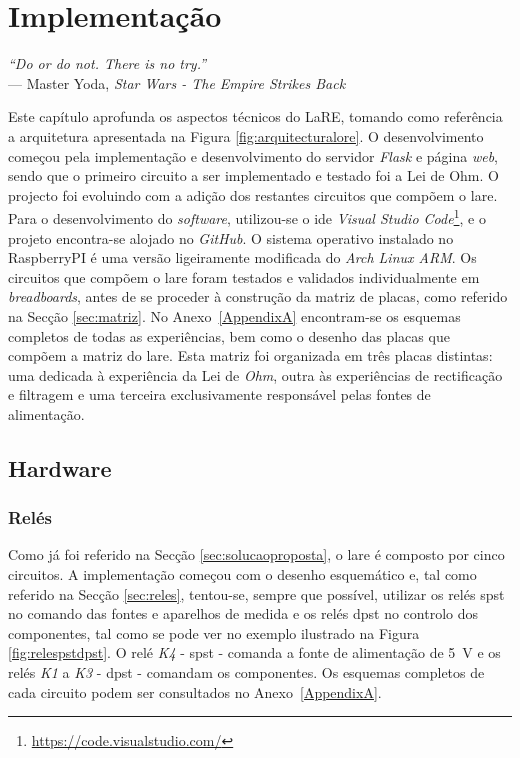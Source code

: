 \chapter{Implementação}
\label{Capítulo4}

\begin{flushright}
\textit{``Do or do not. There is no try.''} \\[0.5em]
--- Master Yoda, \textit{Star Wars - The Empire Strikes Back}
\end{flushright}


Este capítulo aprofunda os aspectos técnicos do LaRE, tomando como referência a arquitetura apresentada na Figura \ref{fig:arquitecturalore}. O desenvolvimento começou pela implementação e desenvolvimento do servidor \textit{Flask} e página \textit{web}, sendo que o primeiro circuito a ser implementado e testado foi a Lei de Ohm. O projecto foi evoluindo com a adição dos restantes circuitos que compõem o \acrshort{lare}. Para o desenvolvimento do \textit{software}, utilizou-se o \acrshort{ide} \textit{Visual Studio Code}\footnote{\url{https://code.visualstudio.com/}}, e o projeto encontra-se alojado no \textit{GitHub}. O sistema operativo instalado no \gls{RaspberryPI} é uma versão ligeiramente modificada do \textit{Arch Linux ARM}. Os circuitos que compõem o \acrshort{lare} foram testados e validados individualmente em \textit{breadboards}, antes de se proceder à construção da matriz de placas, como referido na Secção \ref{sec:matriz}. No Anexo~\ref{AppendixA} encontram-se os esquemas completos de todas as experiências, bem como o desenho das placas que compõem a matriz do \acrshort{lare}. Esta matriz foi organizada em três placas distintas: uma dedicada à experiência da Lei de \textit{Ohm}, outra às experiências de rectificação e filtragem e uma terceira exclusivamente responsável pelas fontes de alimentação.

\section{Hardware}
\subsection{Relés}
\label{sec:hwreles}
Como já foi referido na Secção \ref{sec:solucaoproposta}, o \acrshort{lare} é composto por cinco circuitos. A implementação começou com o desenho esquemático e, tal como referido na Secção \ref{sec:reles}, tentou-se, sempre que possível, utilizar os relés \acrshort{spst} no comando das fontes e aparelhos de medida e os relés \acrshort{dpst} no controlo dos componentes, tal como se pode ver no exemplo ilustrado na Figura \ref{fig:relespstdpst}. O relé \textit{K4} - \acrshort{spst} - comanda a fonte de alimentação de \SI{5}{\volt} e os relés \textit{K1} a \textit{K3} - \acrshort{dpst} - comandam os componentes. Os esquemas completos de cada circuito podem ser consultados no Anexo~\ref{AppendixA}.

